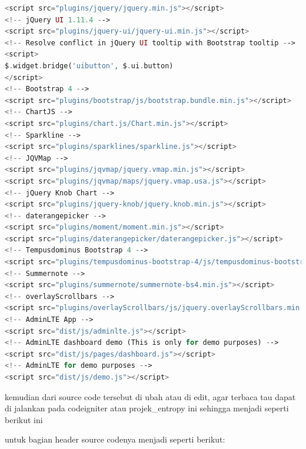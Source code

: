 \begin{lstlisting}[language=PHP]
<script src="plugins/jquery/jquery.min.js"></script>  
<!-- jQuery UI 1.11.4 -->  
<script src="plugins/jquery-ui/jquery-ui.min.js"></script>  
<!-- Resolve conflict in jQuery UI tooltip with Bootstrap tooltip -->  
<script>  
$.widget.bridge('uibutton', $.ui.button)  
</script>  
<!-- Bootstrap 4 -->  
<script src="plugins/bootstrap/js/bootstrap.bundle.min.js"></script>  
<!-- ChartJS -->  
<script src="plugins/chart.js/Chart.min.js"></script>  
<!-- Sparkline -->  
<script src="plugins/sparklines/sparkline.js"></script>  
<!-- JQVMap -->  
<script src="plugins/jqvmap/jquery.vmap.min.js"></script>  
<script src="plugins/jqvmap/maps/jquery.vmap.usa.js"></script>  
<!-- jQuery Knob Chart -->  
<script src="plugins/jquery-knob/jquery.knob.min.js"></script>  
<!-- daterangepicker -->  
<script src="plugins/moment/moment.min.js"></script>  
<script src="plugins/daterangepicker/daterangepicker.js"></script>  
<!-- Tempusdominus Bootstrap 4 -->  
<script src="plugins/tempusdominus-bootstrap-4/js/tempusdominus-bootstrap-4.min.js"></script>  
<!-- Summernote -->  
<script src="plugins/summernote/summernote-bs4.min.js"></script>  
<!-- overlayScrollbars -->  
<script src="plugins/overlayScrollbars/js/jquery.overlayScrollbars.min.js"></script>  
<!-- AdminLTE App -->  
<script src="dist/js/adminlte.js"></script>  
<!-- AdminLTE dashboard demo (This is only for demo purposes) -->  
<script src="dist/js/pages/dashboard.js"></script>  
<!-- AdminLTE for demo purposes -->  
<script src="dist/js/demo.js"></script>  

\end{lstlisting}

kemudian dari source code tersebut di ubah atau di edit, agar terbaca tau dapat di jalankan pada codeigniter atau projek\_entropy ini sehingga menjadi seperti berikut ini 

untuk bagian header source codenya menjadi seperti berikut:

